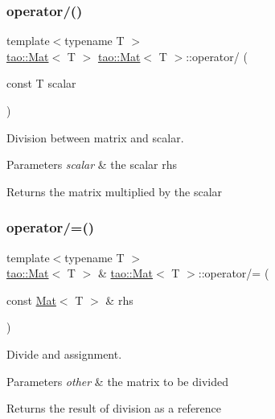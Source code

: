 \subsubsection{\texorpdfstring{operator/()}{operator/()}\hspace{0.1cm}{\footnotesize\ttfamily [2/2]}}
{\footnotesize\ttfamily template$<$typename T $>$ \\
\mbox{\hyperlink{classtao_1_1_mat}{tao\+::\+Mat}}$<$ T $>$ \mbox{\hyperlink{classtao_1_1_mat}{tao\+::\+Mat}}$<$ T $>$\+::operator/ (\begin{DoxyParamCaption}\item[{const T}]{scalar }\end{DoxyParamCaption})}



Division between matrix and scalar. 


\begin{DoxyParams}{Parameters}
{\em scalar} & the scalar rhs \\
\hline
\end{DoxyParams}
\begin{DoxyReturn}{Returns}
the matrix multiplied by the scalar 
\end{DoxyReturn}
\mbox{\label{classtao_1_1_mat_a032760595aa5055588624aa56758b323}} 
\subsubsection{\texorpdfstring{operator/=()}{operator/=()}\hspace{0.1cm}{\footnotesize\ttfamily [1/2]}}
{\footnotesize\ttfamily template$<$typename T $>$ \\
\mbox{\hyperlink{classtao_1_1_mat}{tao\+::\+Mat}}$<$ T $>$ \& \mbox{\hyperlink{classtao_1_1_mat}{tao\+::\+Mat}}$<$ T $>$\+::operator/= (\begin{DoxyParamCaption}\item[{const \mbox{\hyperlink{classtao_1_1_mat}{Mat}}$<$ T $>$ \&}]{rhs }\end{DoxyParamCaption})}



Divide and assignment. 


\begin{DoxyParams}{Parameters}
{\em other} & the matrix to be divided \\
\hline
\end{DoxyParams}
\begin{DoxyReturn}{Returns}
the result of division as a reference 
\end{DoxyReturn}
\mbox{\label{classtao_1_1_mat_a2c5e0650cbc59030c4491c439bcd5b28}} 
